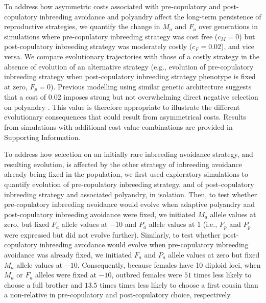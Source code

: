 \documentclass[12pt]{article}
\begin{document}
To address how asymmetric costs associated with pre-copulatory and post-copulatory inbreeding avoidance and polyandry affect the long-term persistence of reproductive strategies, we quantify the change in $M_{a}$ and $F_{a}$ over generations in simulations where pre-copulatory inbreeding strategy was cost free ($c_{M}=0$) but post-copulatory inbreeding strategy was moderately costly ($c_{F}=0.02$), and vice versa. We compare evolutionary trajectories with those of a costly strategy in the absence of evolution of an alternative strategy (e.g., evolution of pre-copulatory inbreeding strategy when post-copulatory inbreeding strategy phenotype is fixed at zero, $F_{p}=0$). Previous modelling using similar genetic architecture suggests that a cost of $0.02$ imposes strong but not overwhelming direct negative selection on polyandry \cite[][]{Duthie}. This value is therefore appropriate to illustrate the different evolutionary consequences that could result from asymmetrical costs. Results from simulations with additional cost value combinations are provided in Supporting Information.

To address how selection on an initially rare inbreeding avoidance strategy, and resulting evolution, is affected by the other strategy of inbreeding avoidance already being fixed in the population, we first used exploratory simulations to quantify evolution of pre-copulatory inbreeding strategy, and of post-copulatory inbreeding strategy and associated polyandry, in isolation. Then, to test whether pre-copulatory inbreeding avoidance would evolve when adaptive polyandry and post-copulatory inbreeding avoidance were fixed, we initiated $M_{a}$ allele values at zero, but fixed $F_{a}$ allele values at $-10$ and $P_{a}$ allele values at $1$ (i.e., $F_{p}$ and $P_{p}$ were expressed but did not evolve further). Similarly, to test whether post-copulatory inbreeding avoidance would evolve when pre-copulatory inbreeding avoidance was already fixed, we initiated $F_{a}$ and $P_{a}$ allele values at zero but fixed $M_{a}$ allele values at $-10$. Consequently, because females have 10 diploid loci, when $M_{a}$ or $F_{a}$ alleles were fixed at $-10$, outbred females were $51$ times less likely to choose a full brother and $13.5$ times times less likely to choose a first cousin than a non-relative in pre-copulatory and post-copulatory choice, respectively.
\end{document}
